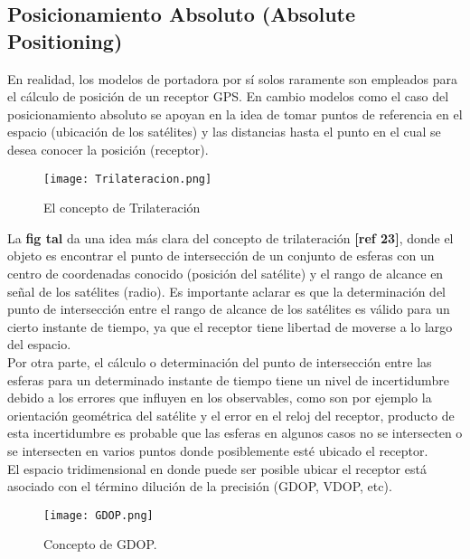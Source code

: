 \subsection{Posicionamiento Absoluto (Absolute Positioning)}

En realidad, los modelos de portadora por sí solos raramente son empleados para el cálculo de posición de un receptor GPS. En cambio modelos como el caso del posicionamiento absoluto se apoyan en la idea de tomar puntos de referencia en el espacio (ubicación de los satélites) y las distancias hasta el punto en el cual se desea conocer la posición (receptor). 

	\begin{figure}[ht]
		    \centering
		    \texttt{[image: Trilateracion.png]}
		    \caption{El concepto de Trilateración}
		    \label{fig:Trilateracion}
	\end{figure}

La \textbf{fig tal} da una idea más clara del concepto de trilateración \textbf{[ref 23]}, donde el objeto es encontrar el punto de intersección de un conjunto de esferas con un centro de coordenadas conocido (posición del satélite) y el rango de alcance en señal de los satélites (radio).  Es importante aclarar es que la determinación del punto de intersección entre el rango de alcance de los satélites es válido para un cierto instante de tiempo, ya que el receptor tiene libertad de moverse a lo largo del espacio. \\

Por otra parte, el cálculo o determinación del punto de intersección entre las esferas para un determinado instante de tiempo tiene un nivel de incertidumbre debido a los errores que influyen en los observables, como son por ejemplo la orientación geométrica del satélite y el error en el reloj del receptor, producto de esta incertidumbre es probable que las esferas en algunos casos no se intersecten o se intersecten en varios puntos donde posiblemente esté ubicado el receptor.\\

El espacio tridimensional en donde puede ser posible ubicar el receptor está asociado con el término dilución de la precisión (GDOP, VDOP, etc).\\

	\begin{figure}[ht]
		    \centering
		    \texttt{[image: GDOP.png]}
		    \caption{Concepto de GDOP.}
		    \label{fig:DOP}
	\end{figure}


